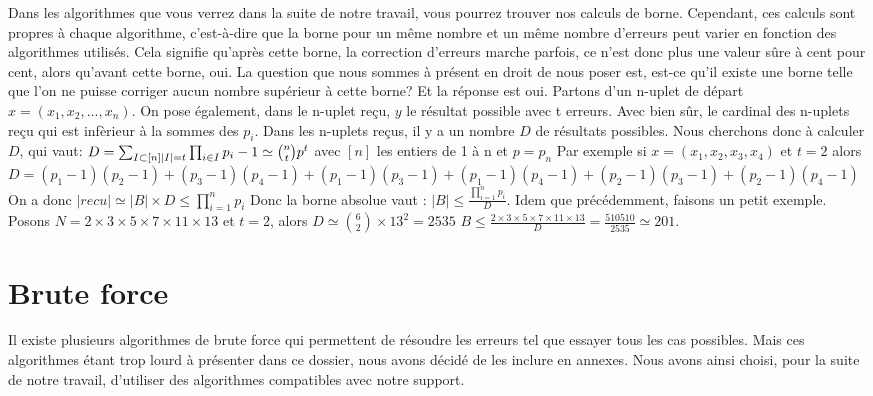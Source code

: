 \documentclass[a4paper, 11pt]{report}
\begin{document}
Dans les algorithmes que vous verrez dans la suite de notre travail, vous pourrez trouver nos calculs de borne. Cependant, ces calculs sont propres à chaque algorithme,
c'est-à-dire que la borne pour un même nombre et un même nombre d'erreurs peut varier en fonction des algorithmes utilisés. \newline
Cela signifie qu'après cette borne, la correction d'erreurs marche parfois, ce n'est donc plus une valeur sûre à cent pour cent, alors qu'avant cette borne, oui.
\newline
La question que nous sommes à présent en droit de nous poser est, est-ce qu'il existe une borne telle que l'on ne puisse corriger aucun nombre supérieur à cette borne? Et la réponse est oui.
Partons d'un n-uplet de départ $x=(x_1, x_2, ..., x_n)$. On pose également, dans le n-uplet reçu, $y$ le résultat possible avec t erreurs. Avec bien sûr, le cardinal des n-uplets reçu qui est infèrieur à la sommes des $p_i$. Dans les n-uplets reçus, il y a un nombre $D$ de résultats possibles. Nous cherchons donc à calculer $D$, qui vaut: \newline
$D=\sum_{I \subset  [n]  \newline |I|=t  }  \prod _{i \in I} p_i - 1 \simeq  \binom{n}{t} p^t  $ avec $[n]$ les entiers de 1 à n et $p=p_n$\newline
Par exemple si $x=(x_1, x_2, x_3, x_4)$ et $t=2$ alors $D=(p_1-1)(p_2-1)+(p_3-1)(p_4-1)+(p_1-1)(p_3-1)+(p_1-1)(p_4-1)+(p_2-1)(p_3-1)+(p_2-1)(p_4-1)$ \newline
On a donc $ |recu| \simeq |B| \times D\leq \prod_{i = 1}^{n} p_i  $ \newline
Donc la borne absolue vaut : $|B| \leq  \frac{\prod_{i= 1}^{n} p_i }{D} $.\newline
Idem que précédemment, faisons un petit exemple. \newline
Posons $N=2\times 3\times 5\times 7\times 11\times 13$ et $t=2$, alors $D\simeq \binom{6}{2}\times 13^2=2535$
$B \leq  \frac{2\times 3\times 5\times 7\times 11\times 13}{D}=\frac{510510}{2535} \simeq 201 $.


\newpage

\chapter{Brute force}

Il existe plusieurs algorithmes de brute force qui permettent de résoudre les erreurs tel que essayer tous les cas possibles. Mais ces algorithmes étant trop lourd à présenter dans ce dossier, nous avons décidé de les inclure en annexes.
Nous avons ainsi choisi, pour la suite de notre travail, d'utiliser des algorithmes compatibles avec notre support.
\end{document}
